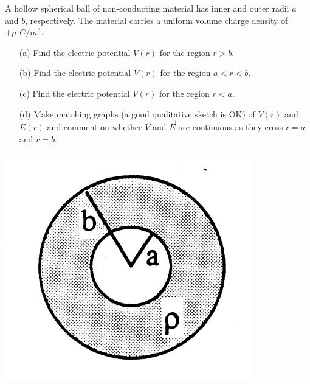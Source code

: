 \documentclass[12pt,letterpaper,boxed,cm]{hmcpset}
\begin{document}
\newpage
\begin{problem}[SUP13]
	A hollow spherical ball of non-conducting material has inner and outer radii $a$ and $b$, respectively. The material carries a uniform volume charge density of $+\rho~\SI{}{C/m^3}$.
	\begin{enumerate}
		\item[(a)] Find the electric potential $V(r)$ for the region $r > b$.
		\item[(b)] Find the electric potential $V(r)$ for the region $a < r < b$.
		\item[(c)] Find the electric potential $V(r)$ for the region $r < a$.
		\item[(d)] Make matching graphs (a good qualitative sketch is OK) of $V(r)$ and $E(r)$ and comment on whether $V$ and $\vec{E}$ are continuous as they cross $r = a$ and $r = b$.
	\end{enumerate}
	\begin{center}
		\includegraphics[scale=0.7]{01.png}
	\end{center}
\end{problem}
\begin{solution}
\end{solution}
\end{document}
